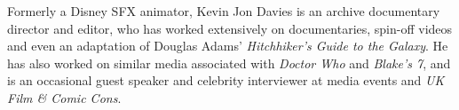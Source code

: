 Formerly a Disney SFX animator, Kevin Jon Davies is an archive documentary director and editor, who has worked extensively on documentaries, spin-off videos and even an adaptation of Douglas Adams' \emph{Hitchhiker's Guide to the Galaxy}. He has also worked on similar media associated with \emph{Doctor Who} and \emph{Blake's 7}, and is an occasional guest speaker and celebrity interviewer at media events and \emph{UK Film \& Comic Cons}.
